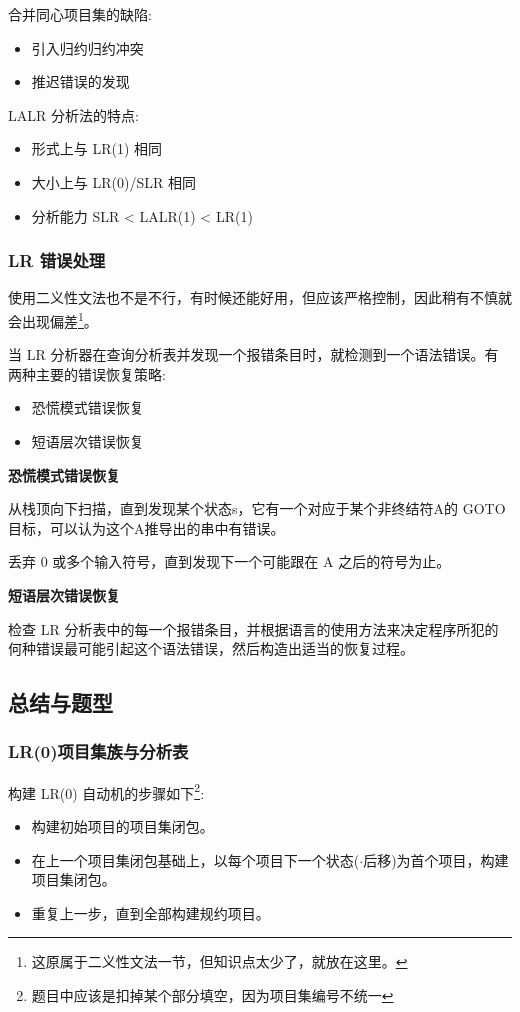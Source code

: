 合并同心项目集的缺陷:
\begin{itemize}
    \item 引入归约归约冲突
    \item 推迟错误的发现
\end{itemize}

LALR 分析法的特点:
\begin{itemize}
    \item 形式上与 LR(1) 相同
    \item 大小上与 LR(0)/SLR 相同
    \item 分析能力 SLR < LALR(1) < LR(1)
\end{itemize}

\subsubsection{LR 错误处理}

使用二义性文法也不是不行，有时候还能好用，但应该严格控制，因此稍有不慎就会出现偏差\footnote{这原属于二义性文法一节，但知识点太少了，就放在这里。}。

当 LR 分析器在查询分析表并发现一个报错条目时，就检测到一个语法错误。有两种主要的错误恢复策略:
\begin{itemize}
    \item 恐慌模式错误恢复
    \item 短语层次错误恢复
\end{itemize}

\noindent\textbf{恐慌模式错误恢复}

从栈顶向下扫描，直到发现某个状态s，它有一个对应于某个非终结符A的 GOTO 目标，可以认为这个A推导出的串中有错误。

丢弃 0 或多个输入符号，直到发现下一个可能跟在 A 之后的符号为止。

\noindent\textbf{短语层次错误恢复}

检查 LR 分析表中的每一个报错条目，并根据语言的使用方法来决定程序所犯的何种错误最可能引起这个语法错误，然后构造出适当的恢复过程。

\subsection{总结与题型}
\subsubsection{\textcolor{imp}{LR(0)项目集族与分析表}}

构建 LR(0) 自动机的步骤如下\footnote{题目中应该是扣掉某个部分填空，因为项目集编号不统一}:
\begin{itemize}
    \item 构建初始项目的项目集闭包。
    \item 在上一个项目集闭包基础上，以每个项目下一个状态($\cdot$后移)为首个项目，构建项目集闭包。
    \item 重复上一步，直到全部构建规约项目。
\end{itemize}

